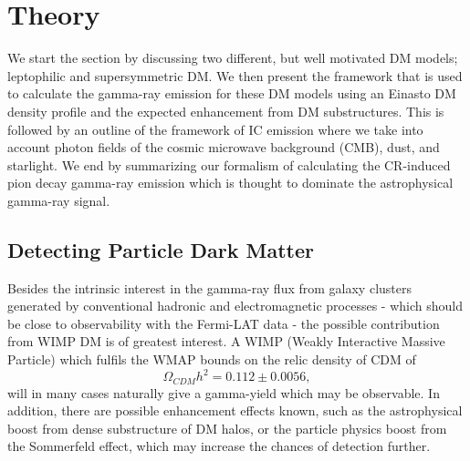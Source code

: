 \documentclass[10pt,aps,pra,reprint,amsmath,amsfonts,amssymb,showpacs,nofootinbib,floatfix]{revtex4-1}
\begin{document}
\section{Theory}
\label{sect:theory}
We start the section by discussing two different, but well motivated
DM models; leptophilic and supersymmetric DM. We then present the
framework that is used to calculate the gamma-ray emission for these
DM models using an Einasto DM density profile and the expected
enhancement from DM substructures. This is followed by an outline of
the framework of IC emission where we take into account photon fields
of the cosmic microwave background (CMB), dust, and starlight. We end
by summarizing our formalism of calculating the CR-induced pion decay
gamma-ray emission which is thought to dominate the astrophysical
gamma-ray signal.


\subsection{Detecting Particle Dark Matter}
\label{sect:PF}
Besides the intrinsic interest in the gamma-ray flux from galaxy
clusters generated by conventional hadronic and electromagnetic
processes - which should be close to observability with the Fermi-LAT
data
\cite{1997ApJ...487..529B,2007A&A...473...41E,2010MNRAS.409..449P} -
the possible contribution from WIMP DM is of greatest interest. A WIMP
(Weakly Interactive Massive Particle) which fulfils the WMAP bounds on
the relic density of CDM of \cite{Komatsu:2010fb}
$$\Omega_{CDM}h^2=0.112\pm 0.0056,$$ will in many cases naturally give
a gamma-yield which may be observable. In addition, there are possible
enhancement effects known, such as the astrophysical boost from dense
substructure of DM halos, or the particle physics boost from the
Sommerfeld effect, which may increase the chances of detection
further.
\end{document}
